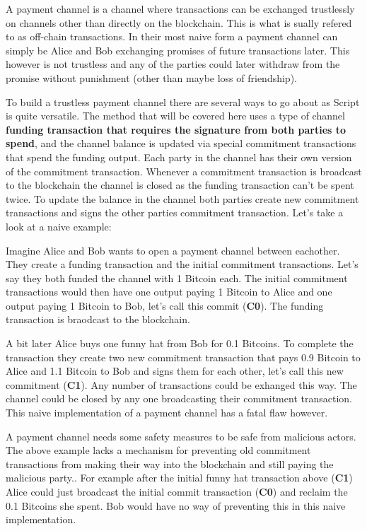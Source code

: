 
A payment channel is a channel where transactions can be exchanged trustlessly on channels other than directly on the blockchain.
This is what is sually refered to as off-chain transactions.
In their most naive form a payment channel can simply be Alice and Bob exchanging promises of future transactions later.
This however is not trustless and any of the parties could later withdraw from the promise without punishment (other than maybe loss of friendship).

To build a trustless payment channel there are several ways to go about as Script is quite versatile.
The method that will be covered here uses a type of channel \textbf{funding transaction that requires the signature from both parties to spend}, and the channel balance is updated via special commitment transactions that spend the funding output. Each party in the channel has their own version of the commitment transaction. Whenever a commitment transaction is broadcast to the blockchain the channel is closed as the funding transaction can't be spent twice. To update the balance in the channel both parties create new commitment transactions and signs the other parties commitment transaction.  
Let's take a look at a naive example:

Imagine Alice and Bob wants to open a payment channel between eachother. They create a funding transaction and the initial commitment transactions. Let's say they both funded the channel with 1 Bitcoin each. The initial commitment transactions would then have one output paying 1 Bitcoin to Alice and one output paying 1 Bitcoin to Bob, let's call this commit (\textbf{C0}).
The funding transaction is braodcast to the blockchain.

A bit later Alice buys one funny hat from Bob for 0.1 Bitcoins. To complete the transaction they create two new commitment transaction that pays 0.9 Bitcoin to Alice and 1.1 Bitcoin to Bob and signs them for each other, let's call this new commitment (\textbf{C1}). Any number of transactions could be exhanged this way. The channel could be closed by any one broadcasting their commitment transaction. This naive implementation of a payment channel has a fatal flaw however. 

A payment channel needs some safety measures to be safe from malicious actors. The above example lacks a mechanism for preventing old commitment transactions from making their way into the blockchain and still paying the malicious party.. For example after the initial funny hat transaction above (\textbf{C1}) Alice could just broadcast the initial commit transaction (\textbf{C0}) and reclaim the 0.1 Bitcoins she spent. Bob would have no way of preventing this in this naive implementation.


